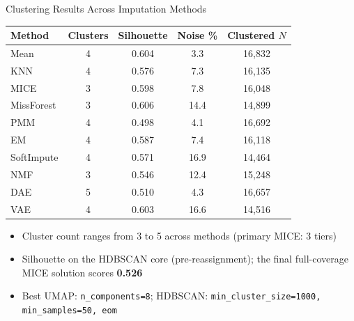 \documentclass[aspectratio=169, 11pt]{beamer}
\begin{document}
\begin{frame}{Clustering Results Across Imputation Methods}
  \small
  \centering
  \begin{tabular}{l c c c c}
    \toprule
    \textbf{Method} & \textbf{Clusters} & \textbf{Silhouette} & \textbf{Noise \%} & \textbf{Clustered $N$} \\
    \midrule
    Mean       & 4 & 0.604 &  3.3 & 16,832 \\
    KNN        & 4 & 0.576 &  7.3 & 16,135 \\
    MICE       & 3 & 0.598 &  7.8 & 16,048 \\
    MissForest & 3 & 0.606 & 14.4 & 14,899 \\
    PMM        & 4 & 0.498 &  4.1 & 16,692 \\
    EM         & 4 & 0.587 &  7.4 & 16,118 \\
    SoftImpute & 4 & 0.571 & 16.9 & 14,464 \\
    NMF        & 3 & 0.546 & 12.4 & 15,248 \\
    DAE        & 5 & 0.510 &  4.3 & 16,657 \\
    VAE        & 4 & 0.603 & 16.6 & 14,516 \\
    \bottomrule
  \end{tabular}

  \vspace{0.5em}
  \begin{itemize}
    \item Cluster count ranges from 3 to 5 across methods (primary MICE: 3 tiers)
    \item Silhouette on the HDBSCAN core (pre-reassignment); the final full-coverage MICE solution scores \textbf{0.526}
    \item Best UMAP: \texttt{n\_components=8}; HDBSCAN: \texttt{min\_cluster\_size=1000, min\_samples=50, eom}
  \end{itemize}
\end{frame}
\end{document}
